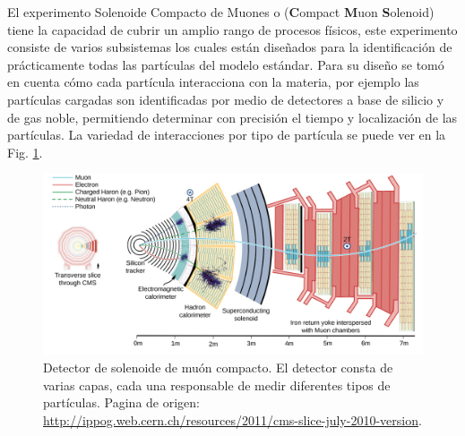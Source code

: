El experimento Solenoide Compacto de Muones o \CMS(\textbf{C}ompact \textbf{M}uon \textbf{S}olenoid) tiene la capacidad de cubrir un amplio rango de procesos físicos, este experimento consiste de varios subsistemas los cuales están diseñados para la identificación de prácticamente todas las partículas del modelo estándar. Para su diseño se tomó en cuenta cómo cada partícula interacciona con la materia, por ejemplo las partículas cargadas son identificadas por medio de detectores a base de silicio y de gas noble, permitiendo determinar con precisión el tiempo y localización de las partículas. La variedad de interacciones por tipo de partícula se puede ver en la Fig. \ref{cms}.

\begin{figure}
\centering
\includegraphics[width=1\textwidth]{Analisis_y_Resultados/imagenes/CMS_interaction.png}
\caption{Detector de solenoide de muón compacto. El detector consta de varias capas, cada una responsable de medir diferentes tipos de partículas. Pagina de origen: \url{http://ippog.web.cern.ch/resources/2011/cms-slice-july-2010-version}.}
\label{cms}
\end{figure}

